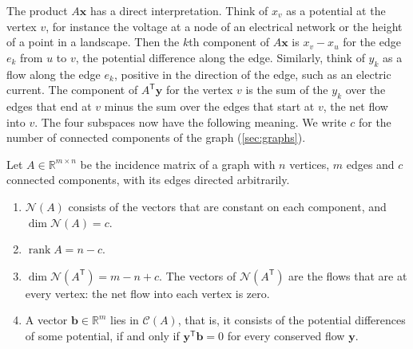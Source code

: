 \begin{figure}
\end{figure}

The product $A\mathbf x$ has a direct interpretation. Think of $x_v$ as a potential at the vertex $v$, for instance the voltage at a node of an electrical network or the height of a point in a landscape. Then the $k$th component of $A\mathbf x$ is $x_v-x_u$ for the edge $e_k$ from $u$ to $v$, the potential difference along the edge. Similarly, think of $y_k$ as a flow along the edge $e_k$, positive in the direction of the edge, such as an electric current. The component of $A^{\mathsf T}\mathbf y$ for the vertex $v$ is the sum of the $y_k$ over the edges that end at $v$ minus the sum over the edges that start at $v$, the net flow into $v$. The four subspaces now have the following meaning. We write $c$ for the number of connected components of the graph (\cref{sec:graphs}).

\begin{proposition}
\label{prop:incidence}
Let $A\in\mathbb R^{m\times n}$ be the incidence matrix of a graph with $n$ vertices, $m$ edges and $c$ connected components, with its edges directed arbitrarily.
\begin{enumerate}
\item $\mathcal N(A)$ consists of the vectors that are constant on each component, and $\dim\mathcal N(A)=c$.
\item $\operatorname{rank}A=n-c$.
\item $\dim\mathcal N(A^{\mathsf T})=m-n+c$. The vectors of $\mathcal N(A^{\mathsf T})$ are the flows that are  at every vertex: the net flow into each vertex is zero.
\item A vector $\mathbf b\in\mathbb R^m$ lies in $\mathcal C(A)$, that is, it consists of the potential differences of some potential, if and only if $\mathbf y^{\mathsf T}\mathbf b=0$ for every conserved flow $\mathbf y$.
\end{enumerate}
\end{proposition}

